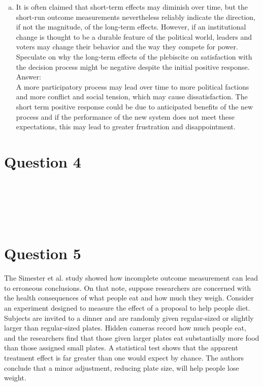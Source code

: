 \documentclass[11pt,notitlepage]{article}\usepackage[]{graphicx}\usepackage[]{color}
\makeatletter
\newenvironment{kframe}{%
 \def\at@end@of@kframe{}%
 \ifinner\ifhmode%
  \def\at@end@of@kframe{\end{minipage}}%
  \begin{minipage}{\columnwidth}%
 \fi\fi%
 \def\FrameCommand##1{\hskip\@totalleftmargin \hskip-\fboxsep
 \colorbox{shadecolor}{##1}\hskip-\fboxsep
     \hskip-\linewidth \hskip-\@totalleftmargin \hskip\columnwidth}%
 \MakeFramed {\advance\hsize-\width
   \@totalleftmargin\z@ \linewidth\hsize
   \@setminipage}}%
 {\par\unskip\endMakeFramed%
 \at@end@of@kframe}
\newenvironment{knitrout}{}{} %
\makeatother
\begin{document}
\begin{enumerate}[a)]
\item It is often claimed that short-term effects may diminish over time, but the short-run outcome measurements nevertheless reliably indicate the direction, if not the magnitude, of the long-term effects. However, if an institutional change is thought to be a durable feature of the political world, leaders and voters may change their behavior and the way they compete for power. Speculate on why the long-term effects of the plebiscite on satisfaction with the decision process might be negative despite the initial positive response.\\
Answer:\\
A more participatory process may lead over time to more political factions and more conflict and social tension, which may cause dissatisfaction. The short term positive response could be due to anticipated benefits of the new process and if the performance of the new system does not meet these expectations, this may lead to greater frustration and disappointment. 

\end{enumerate}


\section*{Question 4}
\begin{knitrout}
\color{fgcolor}\begin{kframe}
\begin{verbatim}






\end{verbatim}
\end{kframe}
\end{knitrout}

\section*{Question 5}
The Simester et al. study showed how incomplete outcome measurement can lead to erroneous conclusions. On that note, suppose researchers are concerned with the health consequences of what people eat and how much they weigh. Consider an experiment designed to measure the effect of a proposal to help people diet. Subjects are invited to a dinner and are randomly given regular-sized or slightly larger than regular-sized plates. Hidden cameras record how much people eat, and the researchers find that those given larger plates eat substantially more food than those assigned small plates. A statistical test shows that the apparent treatment effect is far greater than one would expect by chance. The authors conclude that a minor adjustment, reducing plate size, will help people lose weight.
\end{document}
